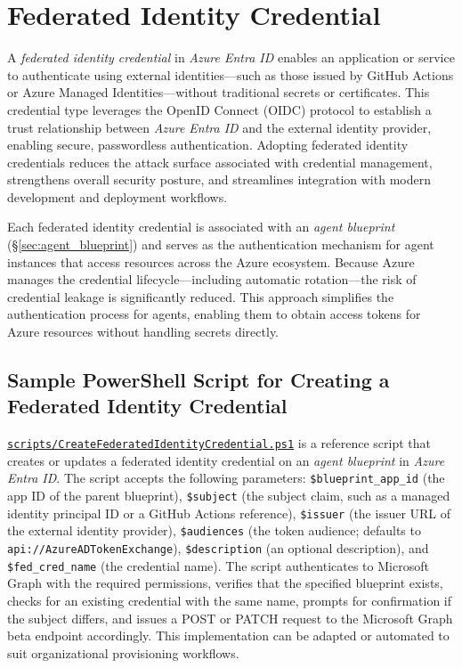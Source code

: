 \documentclass[9pt]{extarticle}%
\begin{document}
\section{Federated Identity Credential}%
A \textit{federated identity credential} in \textit{Azure Entra ID} enables an application or service to authenticate using external identities---such as those issued by GitHub Actions or Azure Managed Identities---without traditional secrets or certificates. This credential type leverages the OpenID Connect (OIDC) protocol to establish a trust relationship between \textit{Azure Entra ID} and the external identity provider, enabling secure, passwordless authentication. Adopting federated identity credentials reduces the attack surface associated with credential management, strengthens overall security posture, and streamlines integration with modern development and deployment workflows.
%
\par\vspace{\baselineskip}%
Each federated identity credential is associated with an \textit{agent blueprint} (\S\ref{sec:agent_blueprint}) and serves as the authentication mechanism for agent instances that access resources across the Azure ecosystem. Because Azure manages the credential lifecycle---including automatic rotation---the risk of credential leakage is significantly reduced. This approach simplifies the authentication process for agents, enabling them to obtain access tokens for Azure resources without handling secrets directly.
%
\par\vspace{\baselineskip}%
\subsection{Sample PowerShell Script for Creating a Federated Identity Credential}%
\href{https://github.com/dennisseah/agent-identity/blob/main/scripts/CreateFederatedIdentityCredential.ps1}{\texttt{scripts/CreateFederatedIdentityCredential.ps1}} is a reference script that creates or updates a federated identity credential on an \textit{agent blueprint} in \textit{Azure Entra ID}. The script accepts the following parameters: \texttt{\$blueprint\_app\_id} (the app ID of the parent blueprint), \texttt{\$subject} (the subject claim, such as a managed identity principal ID or a GitHub Actions reference), \texttt{\$issuer} (the issuer URL of the external identity provider), \texttt{\$audiences} (the token audience; defaults to \texttt{api://AzureADTokenExchange}), \texttt{\$description} (an optional description), and \texttt{\$fed\_cred\_name} (the credential name). The script authenticates to Microsoft Graph with the required permissions, verifies that the specified blueprint exists, checks for an existing credential with the same name, prompts for confirmation if the subject differs, and issues a POST or PATCH request to the Microsoft Graph beta endpoint accordingly. This implementation can be adapted or automated to suit organizational provisioning workflows.
%
\par\vspace{\baselineskip}%
\end{document}
